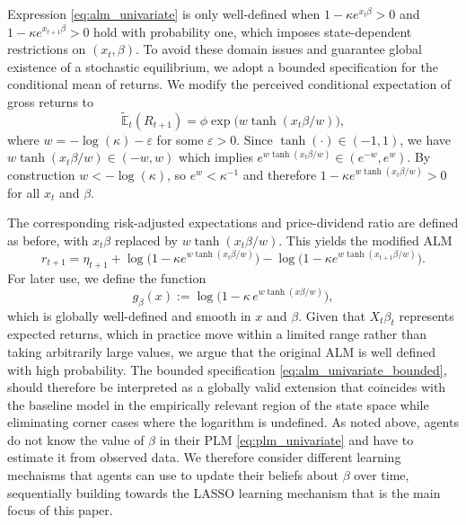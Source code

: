 \documentclass[11pt]{article}
\begin{document}
Expression \eqref{eq:alm_univariate} is only well-defined when $1 - \kappa e^{x_t \beta} > 0$ and $1 - \kappa e^{x_{t+1} \beta} > 0$ hold with probability one, which imposes state-dependent restrictions on $(x_t,\beta)$. To avoid these domain issues and guarantee global existence of a stochastic equilibrium, we adopt a bounded specification for the conditional mean of returns. We modify the perceived conditional expectation of gross returns to
\begin{equation}
    \tilde{\mathbb{E}}_t(R_{t+1}) = \phi \exp\bigl( w \tanh(x_t \beta / w) \bigr),
\end{equation}
where $w = -\log(\kappa) - \varepsilon$ for some $\varepsilon > 0$. Since $\tanh(\cdot) \in (-1,1)$, we have $w \tanh(x_t \beta / w) \in (-w,w)$ which implies $e^{w \tanh(x_t \beta / w)} \in (e^{-w}, e^{w})$. By construction $w < -\log(\kappa)$, so $e^{w} < \kappa^{-1}$ and therefore $1 - \kappa e^{w \tanh(x_t \beta / w)} > 0$ for all $x_t$ and $\beta$.

The corresponding risk-adjusted expectations and price-dividend ratio are defined as before, with $x_t \beta$ replaced by $w \tanh(x_t \beta / w)$. This yields the modified ALM
\begin{equation}\label{eq:alm_univariate_bounded}
    r_{t+1} = \eta_{t+1}
    + \log\bigl(1 - \kappa e^{w \tanh(x_t \beta / w)}\bigr)
    - \log\bigl(1 - \kappa e^{w \tanh(x_{t+1} \beta / w)}\bigr).
\end{equation}
For later use, we define the function
\begin{equation}\label{eq:g_beta_def}
    g_{\beta}(x) 
    := \log\bigl(1 - \kappa\, e^{w \tanh(x \beta/w)}\bigr),
\end{equation}
which is globally well-defined and smooth in $x$ and $\beta$. Given that $X_t \beta_t$ represents expected returns, which in practice move within a limited range rather than taking arbitrarily large values, we argue that the original ALM is well defined with high probability.
The bounded specification \eqref{eq:alm_univariate_bounded}, should therefore be interpreted as a globally valid extension that coincides with the baseline model in the empirically relevant region of the state space while eliminating corner cases where the logarithm is undefined.
As noted above, agents do not know the value of $\beta$ in their PLM \eqref{eq:plm_univariate} and have to estimate it from observed data.
We therefore consider different learning mechaisms that agents can use to update their beliefs about $\beta$ over time, sequentially building towards the LASSO learning mechanism that is the main focus of this paper.
\end{document}
